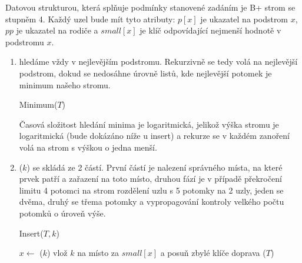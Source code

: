 \documentclass[12pt]{iv003}
\begin{document}

Datovou strukturou, která splňuje podmínky stanovené zadáním je B+ strom se stupněm 4.
Každý uzel bude mít tyto atributy: $p[x]$ je ukazatel na podstrom $x$, $pp$ je ukazatel na rodiče a $small[x]$ je klíč odpovídající nejmenší hodnotě v podstromu $x$.

\begin{enumerate}
	\item \ffminimum hledáme vždy v nejlevějším podstromu. Rekurzivně se tedy volá \ffminimum na nejlevější podstrom, dokud se nedosáhne úrovně listů, kde nejlevější potomek je minimum našeho stromu.\\
	
	\begin{procedure}[H]
		\caption{Minimum($T$)}
		 {
			 
		}
	\end{procedure}
	Časová složitost hledání minima je logaritmická, jelikož výška stromu je logaritmická (bude dokázáno níže u insert) a rekurze se v každém zanoření volá na strom s výškou o jedna menší.
	\item \ffinsert($k$) se skládá ze 2 částí. První částí je nalezení správného místa, na které prvek patří a zařazení na toto místo, druhou fází je v případě překročení limitu 4 potomci na strom rozdělení uzlu s 5 potomky na 2 uzly, jeden se dvěma, druhý se třema potomky a vypropagování kontroly velkého počtu potomků o úroveň výše.\\
	
	\begin{procedure}[H]
		\caption{Insert($T, k$) }
		$x \leftarrow $ \ffselectkey($k$) 
		 {
			vlož $k$ na místo za $small[x]$ a posuň zbylé klíče doprava \; 
			\ffcontrolnode($T$) \;
		}
	\end{procedure}
	

\end{enumerate}
\end{document}
